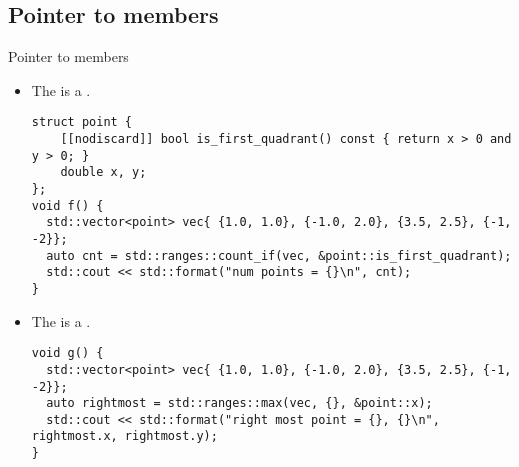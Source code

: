\subsection{Pointer to members}

\begin{frame}[t,fragile]{Pointer to members}
\begin{itemize}
  \item The  
        is a .
\begin{lstlisting}
struct point {
    [[nodiscard]] bool is_first_quadrant() const { return x > 0 and y > 0; }
    double x, y;
};
void f() {
  std::vector<point> vec{ {1.0, 1.0}, {-1.0, 2.0}, {3.5, 2.5}, {-1, -2}};
  auto cnt = std::ranges::count_if(vec, &point::is_first_quadrant);
  std::cout << std::format("num points = {}\n", cnt);
}
\end{lstlisting}

  \item The  
        is a .
\begin{lstlisting}
void g() {
  std::vector<point> vec{ {1.0, 1.0}, {-1.0, 2.0}, {3.5, 2.5}, {-1, -2}};
  auto rightmost = std::ranges::max(vec, {}, &point::x);
  std::cout << std::format("right most point = {}, {}\n", rightmost.x, rightmost.y);
}
\end{lstlisting}
\end{itemize}
\end{frame}
